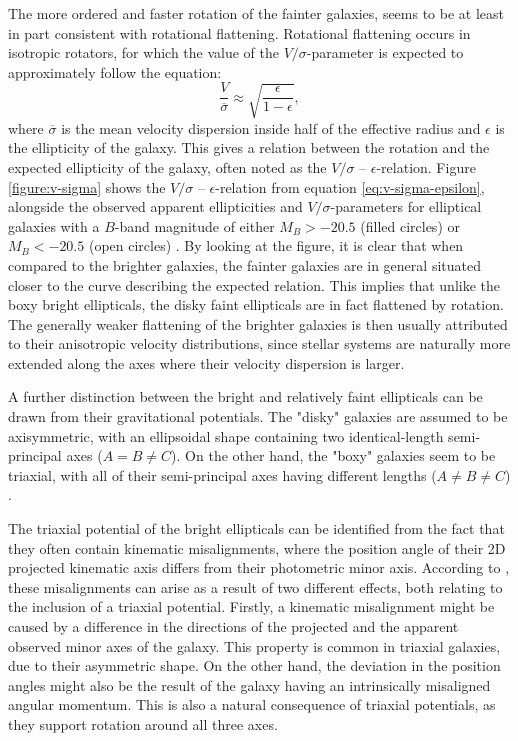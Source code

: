\documentclass[english, twoside]{HYgradu}
\begin{document}
The more ordered and faster rotation of the fainter galaxies, seems to be at least in part consistent with rotational flattening. Rotational flattening occurs in isotropic rotators, for which the value of the $V/\sigma$-parameter is expected to approximately follow the equation:
\begin{equation}
\frac{V}{\overline{\sigma}} \approx \sqrt{\frac{\epsilon}{1-\epsilon}}, \label{eq:v-sigma-epsilon}
\end{equation}
where $\overline{\sigma}$ is the mean velocity dispersion inside half of the effective radius and $\epsilon$ is the ellipticity of the galaxy. This gives a relation between the rotation and the expected ellipticity of the galaxy, often noted as the $V/\sigma$ – $\epsilon$-relation. Figure \ref{figure:v-sigma} shows the $V/\sigma$ – $\epsilon$-relation from equation \ref{eq:v-sigma-epsilon}, alongside the observed apparent ellipticities and $V/\sigma$-parameters for elliptical galaxies with a $B$-band magnitude of either $M_B > -20.5$ (filled circles) or $M_B < -20.5$ (open circles) \citep{Davies1983}. By looking at the figure, it is clear that when compared to the brighter galaxies, the fainter galaxies are in general situated closer to the curve describing the expected relation. This implies that unlike the boxy bright ellipticals, the disky faint ellipticals are in fact flattened by rotation. The generally weaker flattening of the brighter galaxies is then usually attributed to their anisotropic velocity distributions, since stellar systems are naturally more extended along the axes where their velocity dispersion is larger.

A further distinction between the bright and relatively faint ellipticals can be drawn from their gravitational potentials. The "disky" galaxies are assumed to be axisymmetric, with an ellipsoidal shape containing two identical-length semi-principal axes ($A = B \neq C$). On the other hand, the "boxy" galaxies seem to be triaxial, with all of their semi-principal axes having different lengths ($A \neq B \neq C$) \citep{GalaxyFormationAndEvo2010}. 

The triaxial potential of the bright ellipticals can be identified from the fact that they often contain kinematic misalignments, where the position angle of their 2D projected kinematic axis differs from their photometric minor axis. According to \cite{GalaxyFormationAndEvo2010}, these misalignments can arise as a result of two different effects, both relating to the inclusion of a triaxial potential. Firstly, a kinematic misalignment might be caused by a difference in the directions of the projected and the apparent observed minor axes of the galaxy. This property is common in triaxial galaxies, due to their asymmetric shape. On the other hand, the deviation in the position angles might also be the result of the galaxy having an intrinsically misaligned angular momentum. This is also a natural consequence of triaxial potentials, as they support rotation around all three axes. 
\end{document}
